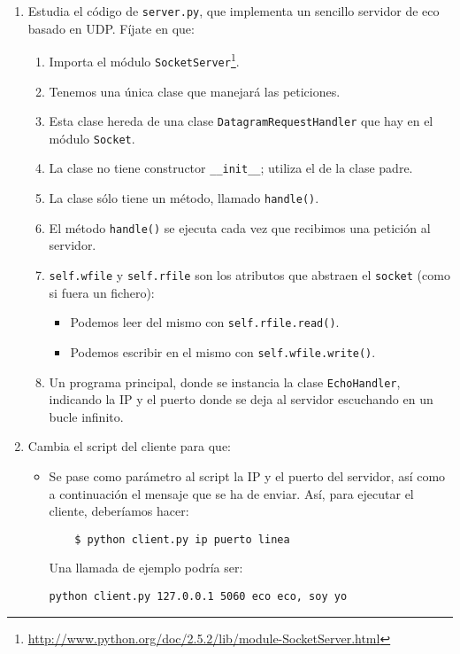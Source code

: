 \documentclass[11pt,a4paper]{article}
\begin{document}
\begin{enumerate}
  \item Estudia el código de \texttt{server.py}, que implementa un sencillo servidor de eco basado en UDP. Fíjate en que:
  \begin{enumerate}
    \item Importa el módulo \texttt{SocketServer}\footnote{\url{http://www.python.org/doc/2.5.2/lib/module-SocketServer.html}}.
    \item Tenemos una única clase que manejará las peticiones.
    \item Esta clase hereda de una clase \texttt{DatagramRequestHandler} que hay en el módulo \texttt{Socket}.
    \item La clase no tiene constructor \texttt{\_\_init\_\_}; utiliza el de la clase padre.
    \item La clase sólo tiene un método, llamado \texttt{handle()}.
    \item El método \texttt{handle()} se ejecuta cada vez que recibimos una petición al servidor.
    \item \texttt{self.wfile} y \texttt{self.rfile} son los atributos que abstraen el \texttt{socket} (como si fuera un fichero):
    \begin{itemize}
      \item Podemos leer del mismo con \texttt{self.rfile.read()}.
      \item Podemos escribir en el mismo con \texttt{self.wfile.write()}.
    \end{itemize}
    \item Un programa principal, donde se instancia la clase \texttt{EchoHandler}, indicando la IP y el puerto donde se deja al servidor escuchando en un bucle infinito.
  \end{enumerate}

  \item Cambia el script del cliente para que:
  \begin{itemize}
    \item Se pase como parámetro al script la IP y el puerto del servidor, así como a continuación el mensaje que se ha de enviar. Así, para ejecutar el cliente, deberíamos hacer:
    \begin{verbatim}
	$ python client.py ip puerto linea
    \end{verbatim}
  Una llamada de ejemplo podría ser: 
\begin{verbatim}
python client.py 127.0.0.1 5060 eco eco, soy yo
\end{verbatim}
  \end{itemize}


\end{enumerate}
\end{document}
